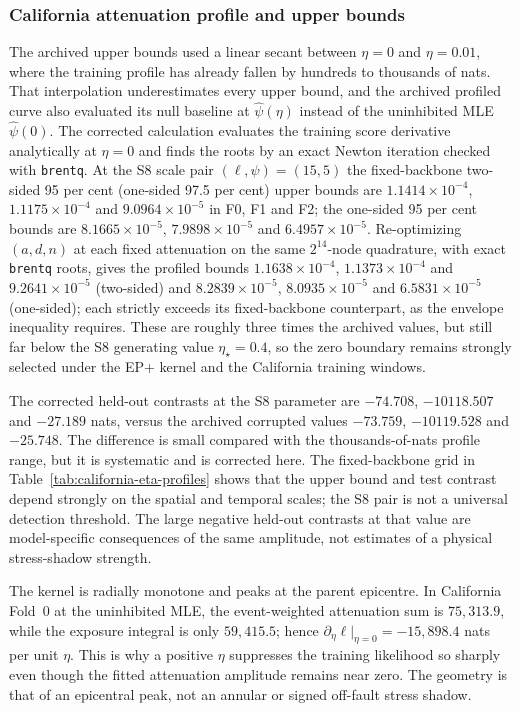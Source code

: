 \subsubsection{California attenuation profile and upper bounds}\label{sec:california-eta-profiles}
The archived upper bounds used a linear secant between $\eta=0$ and $\eta=0.01$, where the training profile has already fallen by hundreds to thousands of nats. That interpolation underestimates every upper bound, and the archived profiled curve also evaluated its null baseline at $\hat\psi(\eta)$ instead of the uninhibited MLE $\hat\psi(0)$. The corrected calculation evaluates the training score derivative analytically at $\eta=0$ and finds the roots by an exact Newton iteration checked with \texttt{brentq}. At the S8 scale pair $(\ell,\psi)=(15,5)$ the fixed-backbone two-sided 95 per cent (one-sided 97.5 per cent) upper bounds are $1.1414\times10^{-4}$, $1.1175\times10^{-4}$ and $9.0964\times10^{-5}$ in F0, F1 and F2; the one-sided 95 per cent bounds are $8.1665\times10^{-5}$, $7.9898\times10^{-5}$ and $6.4957\times10^{-5}$. Re-optimizing $(a,d,n)$ at each fixed attenuation on the same $2^{14}$-node quadrature, with exact \texttt{brentq} roots, gives the profiled bounds $1.1638\times10^{-4}$, $1.1373\times10^{-4}$ and $9.2641\times10^{-5}$ (two-sided) and $8.2839\times10^{-5}$, $8.0935\times10^{-5}$ and $6.5831\times10^{-5}$ (one-sided); each strictly exceeds its fixed-backbone counterpart, as the envelope inequality requires. These are roughly three times the archived values, but still far below the S8 generating value $\eta_\star=0.4$, so the zero boundary remains strongly selected under the EP+ kernel and the California training windows.

The corrected held-out contrasts at the S8 parameter are $-74.708$, $-10118.507$ and $-27.189$ nats, versus the archived corrupted values $-73.759$, $-10119.528$ and $-25.748$. The difference is small compared with the thousands-of-nats profile range, but it is systematic and is corrected here. The fixed-backbone grid in Table~\ref{tab:california-eta-profiles} shows that the upper bound and test contrast depend strongly on the spatial and temporal scales; the S8 pair is not a universal detection threshold. The large negative held-out contrasts at that value are model-specific consequences of the same amplitude, not estimates of a physical stress-shadow strength.

The kernel is radially monotone and peaks at the parent epicentre. In California Fold~0 at the uninhibited MLE, the event-weighted attenuation sum is $75{,}313.9$, while the exposure integral is only $59{,}415.5$; hence $\partial_\eta\ell|_{\eta=0}=-15{,}898.4$ nats per unit $\eta$. This is why a positive $\eta$ suppresses the training likelihood so sharply even though the fitted attenuation amplitude remains near zero. The geometry is that of an epicentral peak, not an annular or signed off-fault stress shadow.

